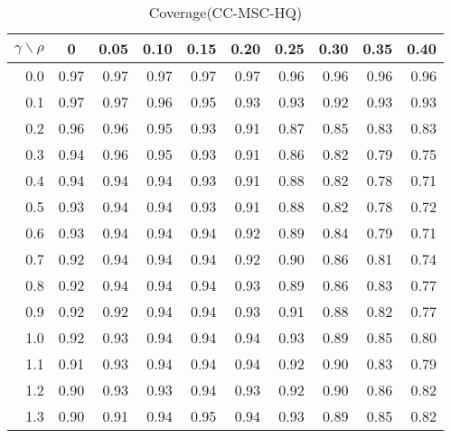 \documentclass[12pt]{article}
\begin{document}
%
\begin{table}[!tbp]
\caption{Coverage(CC-MSC-HQ)}
 \begin{center}
 \begin{tabular}{r|rrrrrrrrr}\hline\hline
\multicolumn{1}{c|}{$\gamma\backslash\rho$}&\multicolumn{1}{c}{0}&\multicolumn{1}{c}{0.05}&\multicolumn{1}{c}{0.10}&\multicolumn{1}{c}{0.15}&\multicolumn{1}{c}{0.20}&\multicolumn{1}{c}{0.25}&\multicolumn{1}{c}{0.30}&\multicolumn{1}{c}{0.35}&\multicolumn{1}{c}{0.40}\tabularnewline
\hline

0.0&0.97&0.97&0.97&0.97&0.97&0.96&0.96&0.96&0.96\tabularnewline
0.1&0.97&0.97&0.96&0.95&0.93&0.93&0.92&0.93&0.93\tabularnewline
0.2&0.96&0.96&0.95&0.93&0.91&0.87&0.85&0.83&0.83\tabularnewline
0.3&0.94&0.96&0.95&0.93&0.91&0.86&0.82&0.79&0.75\tabularnewline
0.4&0.94&0.94&0.94&0.93&0.91&0.88&0.82&0.78&0.71\tabularnewline
0.5&0.93&0.94&0.94&0.93&0.91&0.88&0.82&0.78&0.72\tabularnewline
0.6&0.93&0.94&0.94&0.94&0.92&0.89&0.84&0.79&0.71\tabularnewline
0.7&0.92&0.94&0.94&0.94&0.92&0.90&0.86&0.81&0.74\tabularnewline
0.8&0.92&0.94&0.94&0.94&0.93&0.89&0.86&0.83&0.77\tabularnewline
0.9&0.92&0.92&0.94&0.94&0.93&0.91&0.88&0.82&0.77\tabularnewline
1.0&0.92&0.93&0.94&0.94&0.94&0.93&0.89&0.85&0.80\tabularnewline
1.1&0.91&0.93&0.94&0.94&0.94&0.92&0.90&0.83&0.79\tabularnewline
1.2&0.90&0.93&0.93&0.94&0.93&0.92&0.90&0.86&0.82\tabularnewline
1.3&0.90&0.91&0.94&0.95&0.94&0.93&0.89&0.85&0.82\tabularnewline
\hline
\end{tabular}

\end{center}

\end{table}
\end{document}
